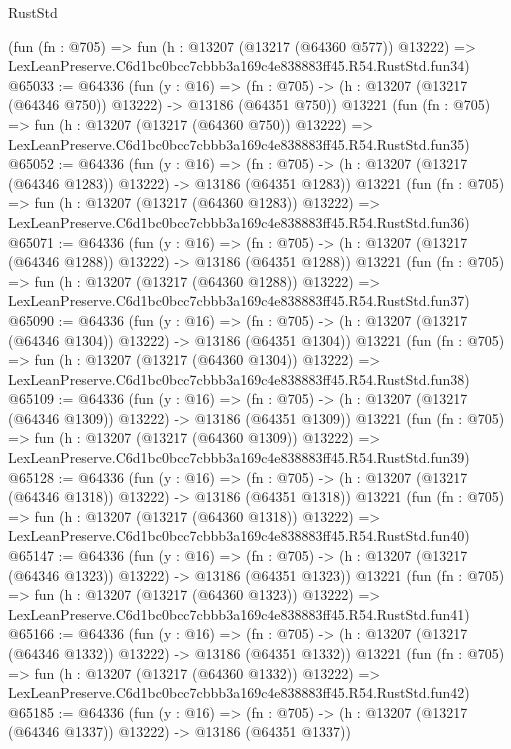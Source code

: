 \begin{lexlean}{RustStd}
\begin{coremodule}
    (fun (fn : @705) =>
    fun (h : @13207 (@13217 (@64360 @577)) @13222) =>
    LexLeanPreserve.C6d1bc0bcc7cbbb3a169c4e838883ff45.R54.RustStd.fun34)
@65033 := @64336
    (fun (y : @16) =>
    (fn : @705) -> (h : @13207 (@13217 (@64346 @750)) @13222) -> @13186 (@64351 @750))
    @13221
    (fun (fn : @705) =>
    fun (h : @13207 (@13217 (@64360 @750)) @13222) =>
    LexLeanPreserve.C6d1bc0bcc7cbbb3a169c4e838883ff45.R54.RustStd.fun35)
@65052 := @64336
    (fun (y : @16) =>
    (fn : @705) -> (h : @13207 (@13217 (@64346 @1283)) @13222) -> @13186 (@64351 @1283))
    @13221
    (fun (fn : @705) =>
    fun (h : @13207 (@13217 (@64360 @1283)) @13222) =>
    LexLeanPreserve.C6d1bc0bcc7cbbb3a169c4e838883ff45.R54.RustStd.fun36)
@65071 := @64336
    (fun (y : @16) =>
    (fn : @705) -> (h : @13207 (@13217 (@64346 @1288)) @13222) -> @13186 (@64351 @1288))
    @13221
    (fun (fn : @705) =>
    fun (h : @13207 (@13217 (@64360 @1288)) @13222) =>
    LexLeanPreserve.C6d1bc0bcc7cbbb3a169c4e838883ff45.R54.RustStd.fun37)
@65090 := @64336
    (fun (y : @16) =>
    (fn : @705) -> (h : @13207 (@13217 (@64346 @1304)) @13222) -> @13186 (@64351 @1304))
    @13221
    (fun (fn : @705) =>
    fun (h : @13207 (@13217 (@64360 @1304)) @13222) =>
    LexLeanPreserve.C6d1bc0bcc7cbbb3a169c4e838883ff45.R54.RustStd.fun38)
@65109 := @64336
    (fun (y : @16) =>
    (fn : @705) -> (h : @13207 (@13217 (@64346 @1309)) @13222) -> @13186 (@64351 @1309))
    @13221
    (fun (fn : @705) =>
    fun (h : @13207 (@13217 (@64360 @1309)) @13222) =>
    LexLeanPreserve.C6d1bc0bcc7cbbb3a169c4e838883ff45.R54.RustStd.fun39)
@65128 := @64336
    (fun (y : @16) =>
    (fn : @705) -> (h : @13207 (@13217 (@64346 @1318)) @13222) -> @13186 (@64351 @1318))
    @13221
    (fun (fn : @705) =>
    fun (h : @13207 (@13217 (@64360 @1318)) @13222) =>
    LexLeanPreserve.C6d1bc0bcc7cbbb3a169c4e838883ff45.R54.RustStd.fun40)
@65147 := @64336
    (fun (y : @16) =>
    (fn : @705) -> (h : @13207 (@13217 (@64346 @1323)) @13222) -> @13186 (@64351 @1323))
    @13221
    (fun (fn : @705) =>
    fun (h : @13207 (@13217 (@64360 @1323)) @13222) =>
    LexLeanPreserve.C6d1bc0bcc7cbbb3a169c4e838883ff45.R54.RustStd.fun41)
@65166 := @64336
    (fun (y : @16) =>
    (fn : @705) -> (h : @13207 (@13217 (@64346 @1332)) @13222) -> @13186 (@64351 @1332))
    @13221
    (fun (fn : @705) =>
    fun (h : @13207 (@13217 (@64360 @1332)) @13222) =>
    LexLeanPreserve.C6d1bc0bcc7cbbb3a169c4e838883ff45.R54.RustStd.fun42)
@65185 := @64336
    (fun (y : @16) =>
    (fn : @705) -> (h : @13207 (@13217 (@64346 @1337)) @13222) -> @13186 (@64351 @1337))

\end{coremodule}
\end{lexlean}
